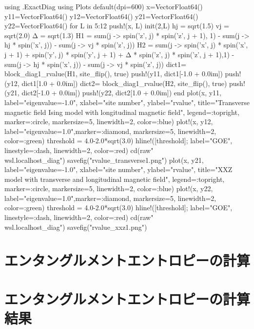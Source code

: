 \documentclass{ltjsarticle}
\begin{document}
\begin{jllisting}
using .ExactDiag
using Plots
default(dpi=600)
x=Vector{Float64}()
y11=Vector{Float64}()
y12=Vector{Float64}()
y21=Vector{Float64}()
y22=Vector{Float64}()
for L in 5:12
  push!(x, L)
  init(2,L)
  hj = sqrt(1.5)
  vj = sqrt(2.0)
  Δ = sqrt(1.3)
  H1 = sum(j -> spin('z', j) * spin('z', j + 1), 1) - sum(j -> hj * spin('x', j)) - sum(j -> vj * spin('z', j))
  H2 = sum(j -> spin('x', j) * spin('x', j + 1) + spin('y', j) * spin('y', j + 1) + Δ * spin('z', j) * spin('z', j + 1),1) - sum(j -> hj * spin('x', j)) - sum(j -> vj * spin('z', j))
  dict1= block_diag1_rvalue(H1, site_flip(), true)
  push!(y11, dict1[-1.0 + 0.0im])
  push!(y12, dict1[1.0 + 0.0im])
  dict2= block_diag1_rvalue(H2, site_flip(), true)
  push!(y21, dict2[-1.0 + 0.0im])
  push!(y22, dict2[1.0 + 0.0im])
end
plot(x, y11, label="eigenvalue=-1.0", xlabel="site number", ylabel="rvalue", title="Transverse magnetic field Ising model with longitudinal magnetic field", legend=:topright, marker=:circle, markersize=5, linewidth=2, color=:blue)
plot!(x, y12, label="eigenvalue=1.0",marker=:diamond, markersize=5, linewidth=2, color=:green)
threshold = 4.0-2.0*sqrt(3.0)
hline!([threshold];
  label="GOE",
  linestyle=:dash, linewidth=2, color=:red)
cd(raw"\\wsl.localhost\Ubuntu\home\kokor\git\exact_diag")
savefig("rvalue_transverse1.png")
plot(x, y21, label="eigenvalue=-1.0", xlabel="site number", ylabel="rvalue", title="XXZ model with transverse and longitudinal magnetic field", legend=:topright, marker=:circle, markersize=5, linewidth=2, color=:blue)
plot!(x, y22, label="eigenvalue=1.0",marker=:diamond, markersize=5, linewidth=2, color=:green)
threshold = 4.0-2.0*sqrt(3.0)
hline!([threshold];
  label="GOE",
  linestyle=:dash, linewidth=2, color=:red)
cd(raw"\\wsl.localhost\Ubuntu\home\kokor\git\exact_diag")
savefig("rvalue_xxz1.png")
\end{jllisting}
\section{エンタングルメントエントロピーの計算}
\section{エンタングルメントエントロピーの計算結果}
\end{document}

